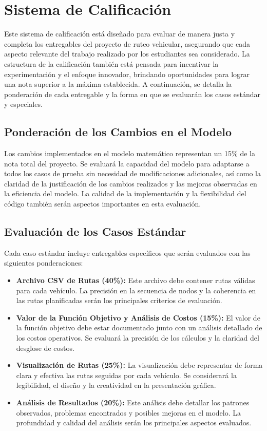 \documentclass[12pt]{article}
\begin{document}
\bigskip

\section{Sistema de Calificación}

Este sistema de calificación está diseñado para evaluar de manera justa y completa los entregables del proyecto de ruteo vehicular, asegurando que cada aspecto relevante del trabajo realizado por los estudiantes sea considerado. La estructura de la calificación también está pensada para incentivar la experimentación y el enfoque innovador, brindando oportunidades para lograr una nota superior a la máxima establecida. A continuación, se detalla la ponderación de cada entregable y la forma en que se evaluarán los casos estándar y especiales.

\subsection{Ponderación de los Cambios en el Modelo}
Los cambios implementados en el modelo matemático representan un 15\% de la nota total del proyecto. Se evaluará la capacidad del modelo para adaptarse a todos los casos de prueba sin necesidad de modificaciones adicionales, así como la claridad de la justificación de los cambios realizados y las mejoras observadas en la eficiencia del modelo. La calidad de la implementación y la flexibilidad del código también serán aspectos importantes en esta evaluación.

\subsection{Evaluación de los Casos Estándar}

Cada caso estándar incluye entregables específicos que serán evaluados con las siguientes ponderaciones:
\begin{itemize}
    \item \textbf{Archivo CSV de Rutas (40\%):} Este archivo debe contener rutas válidas para cada vehículo. La precisión en la secuencia de nodos y la coherencia en las rutas planificadas serán los principales criterios de evaluación.
    \item \textbf{Valor de la Función Objetivo y Análisis de Costos (15\%):} El valor de la función objetivo debe estar documentado junto con un análisis detallado de los costos operativos. Se evaluará la precisión de los cálculos y la claridad del desglose de costos.
    \item \textbf{Visualización de Rutas (25\%):} La visualización debe representar de forma clara y efectiva las rutas seguidas por cada vehículo. Se considerará la legibilidad, el diseño y la creatividad en la presentación gráfica.
    \item \textbf{Análisis de Resultados (20\%):} Este análisis debe detallar los patrones observados, problemas encontrados y posibles mejoras en el modelo. La profundidad y calidad del análisis serán los principales aspectos evaluados.
\end{itemize}
\end{document}
